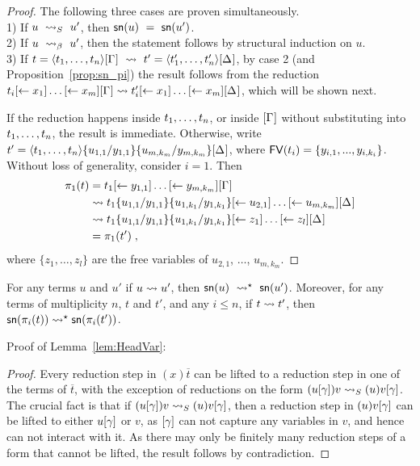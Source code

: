 \documentclass{llncs} %
\begin{document}
\begin{proof}
The following three cases are proven simultaneously.
\\ 1) If $u ~\ALnotbeta~ u'$, then ${\mathsf{sn}}(u) ~=~ {\mathsf{sn}}(u')$.
\\ 2) If $u ~\ALbeta~ u'$, then the statement follows by structural induction on $u$.
\\ 3) If $t=\tup t\G ~\rewrite~ t'=\tup{t'}\G*$, by case 2 (and Proposition~\ref{prop:sn_pi}) the result follows from the reduction
%
	$t_i\share*{}{x_1}\dots\share*{}{x_m}\G\rewrite
	 t'_i\share*{}{x_1}\dots\share*{}{x_m}\G*$,
which will be shown next.

If the reduction happens inside $\vv t$, or inside $\G$ without substituting into
$\vv t$, the result is immediate.
%
Otherwise, write $t'=\tup t\sub{y_{1,1}}{u_{1,1}}\sub{y_{m,k_m}}{u_{m,k_m}}\G*$, where ${\mathop{\mathsf{FV}}}(t_i)=\{y_{i,1},...,y_{i,k_i}\}$.
%
Without loss of generality, consider $i=1$. Then
%
\[
\begin{aligned}
\pi_1(t)
	&= t_1\share*{}{y_{1,1}}\dots\share*{}{y_{m,k_m}}\G
\\ &\rewrite t_1\sub{y_{1,1}}{u_{1,1}}\sub{y_{1,k_1}}{u_{1,k_1}}\share*{}{u_{2,1}}\dots\share*{}{u_{m,k_m}}\G*
\\ &\rewrite t_1\sub{y_{1,1}}{u_{1,1}}\sub{y_{1,k_1}}{u_{1,k_1}}\share*{}{z_1}\dots\share*{}{z_l}\G*
\\ &= \pi_1(t')\;,
\end{aligned}
\]
%
where $\{z_1, \dots, z_l\}$ are the free variables of $u_{2,1}$,
$\dots$, $u_{m,k_m}$.

\end{proof}

\begin{lemma}
\label{lem:lift-sn}
For any terms $u$ and $u'$ if $u\rewrite u'$, then $\sn(u)
~\rewrite^\star~ \sn(u')$. Moreover, for any terms of multiplicity
$n$, $t$ and $t'$, and any $i\leq n$, if $t\rewrite t'$, then
$\sn(\pi_i(t))\rewrite^\star\sn(\pi_i(t'))$.
\end{lemma}


Proof of Lemma~\ref{lem:HeadVar}:

\begin{proof}
Every reduction step in $(x)\overline{t}$ can be lifted to a reduction
step in one of the terms of $\overline{t}$, with the exception of
reductions on the form $(u\g)v\ALnotbeta(u)v\g$. The crucial fact is
that if $(u\g)v\ALnotbeta(u)v\g$, then a reduction step in $(u)v\g$
can be lifted to either $u\g$ or $v$, as $\g$ can not capture any
variables in $v$, and hence can not interact with it.
%
As there may only be finitely many reduction steps of a form that
cannot be lifted, the result follows by contradiction.
\end{proof}
\end{document}
